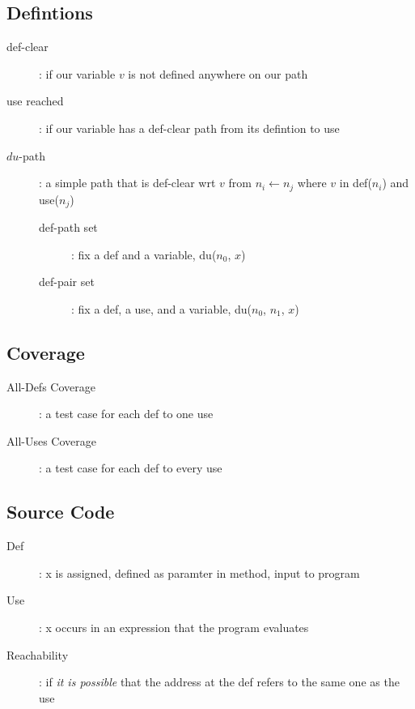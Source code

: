 \documentclass[]{article}
\theoremstyle{definition}
\begin{document}
		\subsection{Defintions}
			\begin{description}
				\item[def-clear]: if our variable $v$ is not defined anywhere on our path 
				\item[use reached]: if our variable has a def-clear path from its defintion to use
				\item[$du$-path]: a simple path that is def-clear wrt $v$ from $n_i \leftarrow n_j$ where $v$ in def($n_i$) and use($n_j$)
					\begin{description}
						\item[def-path set]: fix a def and a variable, du($n_0$, $x$)
						\item[def-pair set]: fix a def, a use, and a variable, du($n_0$, $n_1$, $x$)
					\end{description}
			\end{description}
		\subsection{Coverage}
			\begin{description}
				\item[All-Defs Coverage]: a test case for each def to one use
				\item[All-Uses Coverage]: a test case for each def to every use
			\end{description}
		\subsection{Source Code}
			\begin{description}
				\item[Def]: x is assigned, defined as paramter in method, input to program
				\item[Use]: x occurs in an expression that the program evaluates
				\item[Reachability]: if \textit{it is possible} that the address at the def refers to the same one as the use
			\end{description}
\end{document}
